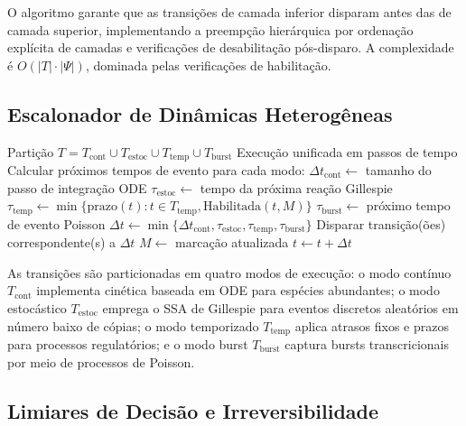 O algoritmo garante que as transições de camada inferior disparam antes das de
camada superior, implementando a preempção hierárquica por ordenação explícita
de camadas e verificações de desabilitação pós-disparo. A complexidade é
$O(|T| \cdot |\Psi|)$, dominada pelas verificações de habilitação.

\subsection{Escalonador de Dinâmicas Heterogêneas}
\label{subsec:escalonador-heterogeneo}

\begin{algorithm}[H]
\caption{Integração de Dinâmicas Heterogêneas}
\label{alg:heterogeneo}
\begin{algorithmic}[1]
\Require Partição $T = T_{\text{cont}} \cup T_{\text{estoc}} \cup T_{\text{temp}} \cup T_{\text{burst}}$
\Ensure Execução unificada em passos de tempo
    \State Calcular próximos tempos de evento para cada modo:
    \State \quad $\Delta t_{\text{cont}} \gets$ tamanho do passo de integração ODE
    \State \quad $\tau_{\text{estoc}} \gets$ tempo da próxima reação Gillespie
    \State \quad $\tau_{\text{temp}} \gets \min\{\text{prazo}(t) : t \in T_{\text{temp}}, \text{Habilitada}(t,M)\}$
    \State \quad $\tau_{\text{burst}} \gets$ próximo tempo de evento Poisson
    \State $\Delta t \gets \min\{\Delta t_{\text{cont}}, \tau_{\text{estoc}}, \tau_{\text{temp}}, \tau_{\text{burst}}\}$
    \State Disparar transição(ões) correspondente(s) a $\Delta t$
    \State $M \gets$ marcação atualizada
    \State $t \gets t + \Delta t$
\EndWhile
\end{algorithmic}
\end{algorithm}

As transições são particionadas em quatro modos de execução: o modo contínuo
$T_{\text{cont}}$ implementa cinética baseada em ODE para espécies abundantes; o
modo estocástico $T_{\text{estoc}}$ emprega o SSA de Gillespie para eventos
discretos aleatórios em número baixo de cópias; o modo temporizado
$T_{\text{temp}}$ aplica atrasos fixos e prazos para processos regulatórios; e o
modo burst $T_{\text{burst}}$ captura bursts transcricionais por meio de processos
de Poisson.

\subsection{Limiares de Decisão e Irreversibilidade}
\label{subsec:decisao}

